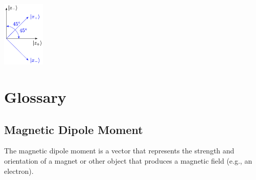 \documentclass{article}
\begin{document}
\begin{center}
	\includegraphics[width=2cm]{quantum_jump.png}
\end{center}

\section{Glossary}
\subsection{Magnetic Dipole Moment}
The magnetic dipole moment is a vector that represents the strength and orientation of a magnet or other object that produces a magnetic field (e.g., an electron).
\end{document}
